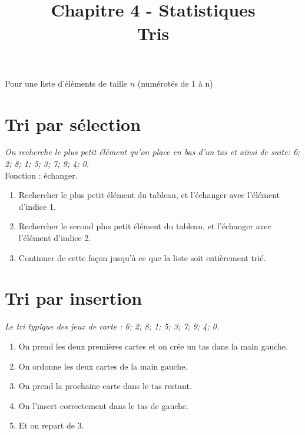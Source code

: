 \documentclass[paper=a4, fontsize=9pt]{scrartcl} %
\title{
  \vspace{-10ex}
  \horrule{0.5pt} \\[0.4cm] %
  \huge Chapitre 4 - Statistiques\\ %
  Tris
  \horrule{2pt} \\[0.5cm] %
}
\author{}
\date{\vspace{-10ex}} %
\begin{document}

\newtheorem{Definition}{Définition}
\newtheorem{Theorem}{Théorème}
\newtheorem{Proposition}{Propriété}

\renewcommand{\labelitemi}{$\bullet$}
\renewcommand{\labelitemii}{$\circ$}

\maketitle %
\setlength{\columnseprule}{1pt}

Pour une liste d'éléments de taille $n$ (numérotés de 1 à n)
\section{Tri par sélection}

\textit{On recherche le plus petit élément qu'on place en bas d'un tas et ainsi de suite: 6; 2; 8; 1; 5; 3; 7; 9; 4; 0.}\\
Fonction : échanger.

\begin{enumerate}
\item Rechercher le plus petit élément du tableau, et l'échanger avec l'élément d'indice 1.
\item Rechercher le second plus petit élément du tableau, et l'échanger avec l'élément d'indice 2.
\item Continuer de cette façon jusqu'à ce que la liste soit entièrement trié.
\end{enumerate}

\section{Tri par insertion}

\textit{Le tri typique des jeux de carte : 6; 2; 8; 1; 5; 3; 7; 9; 4; 0.}

\begin{enumerate}
\item On prend les deux premières cartes et on crée un tas dans la main gauche.
\item On ordonne les deux cartes de la main gauche.
\item On prend la prochaine carte dans le tas restant.
\item On l'insert correctement dans le tas de gauche.
\item Et on repart de 3.
\end{enumerate}
\end{document}
